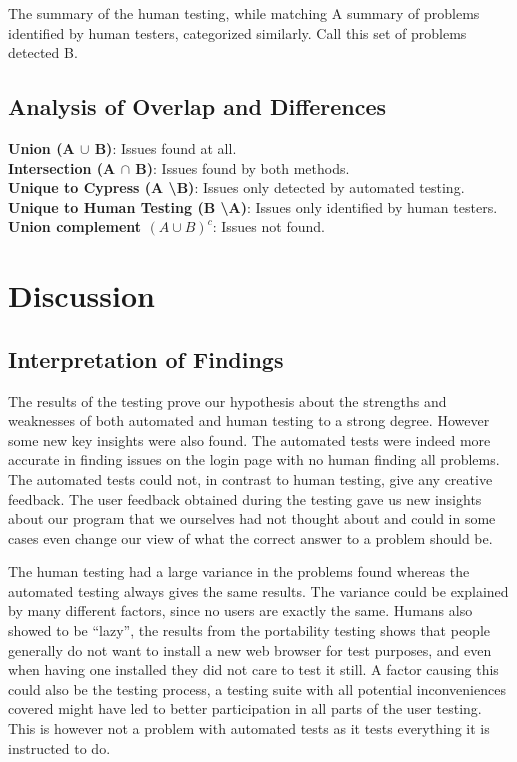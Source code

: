 \documentclass[journal,twocolumn]{IEEEtran}
\begin{document}
The summary of the human testing, while matching
A summary of problems identified by human testers, categorized similarly. Call this set of problems detected B.

\subsection{Analysis of Overlap and Differences}
\textbf{Union (A $\cup$ B)}: Issues found at all. \\
\textbf{Intersection (A $\cap$ B)}: Issues found by both methods. \\
\textbf{Unique to Cypress (A \textbackslash B)}: Issues only detected by automated testing. \\
\textbf{Unique to Human Testing (B \textbackslash A)}: Issues only identified by human testers. \\
\textbf{Union complement $(A \cup B)^c$}: Issues not found.


\section{Discussion}
\subsection{Interpretation of Findings}

The results of the testing prove our hypothesis about the strengths and weaknesses of both automated and human testing to a strong degree. However some new key insights were also found. The automated tests were indeed more accurate in finding issues on the login page with no human finding all problems. The automated tests could not, in contrast to human testing, give any creative feedback. The user feedback obtained during the testing gave us new insights about our program that we ourselves had not thought about and could in some cases even change our view of what the correct answer to a problem should be.

The human testing had a large variance in the problems found whereas the automated testing always gives the same results. The variance could be explained by many different factors, since no users are exactly the same. Humans also showed to be “lazy”, the results from the portability testing shows that people generally do not want to install a new web browser for test purposes, and even when having one installed they did not care to test it still. A factor causing this could also be the testing process, a testing suite with all potential inconveniences covered might have led to better participation in all parts of the user testing. This is however not a problem with automated tests as it tests everything it is instructed to do.
\end{document}
